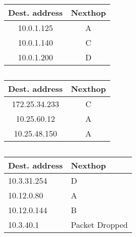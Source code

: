 \documentclass{article}
\begin{document}
\begin{table}[!h]
    \begin{tabular}{|c|c|}
        \hline
        Dest. address & Nexthop \\ \hline
        10.0.1.125    & A       \\ 
        10.0.1.140    & C       \\ 
        10.0.1.200    & D       \\
        \hline
    \end{tabular}
\end{table}

\subsection{}

\begin{table}[!h]
    \begin{tabular}{|c|c|}
        \hline
        Dest. address & Nexthop \\ \hline
        172.25.34.233 & C       \\ 
        10.25.60.12   & A       \\ 
        10.25.48.150  & A       \\
        \hline
    \end{tabular}
\end{table}

\subsection{}

\begin{table}[!h]
    \begin{tabular}{|l|l|}
        \hline
        Dest. address & Nexthop        \\ \hline
        10.3.31.254   & D              \\ 
        10.12.0.80    & A              \\ 
        10.12.0.144   & B              \\ 
        10.3.40.1     & Packet Dropped \\
        \hline
    \end{tabular}
\end{table}


\subsection{}
\end{document}
